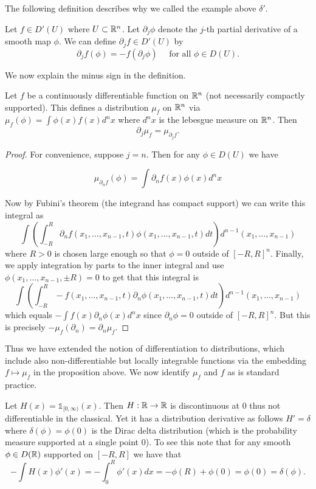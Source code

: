 \documentclass[twoside, a4paper, 10pt]{amsart}
\begin{document}
The following definition describes why we called the example above $\delta'$.

\begin{mydef} Let $f \in D'(U)$ where $U \subset \mathbb{R}^n$. Let $\partial_j \phi$ denote the $j$-th partial derivative of a smooth map $\phi$. We can define $\partial_j f \in D'(U)$ by $$\partial_j f (\phi) = - f(\partial_j \phi) \quad \text{ for all } \phi \in D(U).$$ 

\end{mydef}

We now explain the minus sign in the definition.

\begin{prop} Let $f$ be a continuously differentiable function on $\mathbb{R}^n$ (not necessarily compactly supported). This defines a distribution $\mu_f$ on $\mathbb{R}^n$ via $\mu_f (\phi) = \int \phi(x) f(x) d^n x$ where $d^n x$ is the lebesgue measure on $\mathbb{R}^n$. Then $$\partial_j \mu_f = \mu_{\partial_j f}.$$

\end{prop}

\begin{proof} For convenience, suppose $j = n$. Then for any $\phi \in D(U)$ we have 

$$ \mu_{\partial_n f} (\phi) = \int \partial_n f(x) \phi (x) d^n x $$

Now by Fubini's theorem (the integrand has compact support) we can write this integral as $$ \int \left(\int_{-R}^{R} \partial_n f(x_1, \ldots, x_{n-1}, t) \phi (x_1, \ldots, x_{n-1}, t)  dt \right) d^{n-1}(x_1, \ldots, x_{n-1})$$ where $R > 0$ is chosen large enough so that $\phi = 0$ outside of $[-R,R]^n$. Finally, we apply integration by parts to the inner integral and use $\phi(x_1, \ldots, x_{n-1}, \pm R) = 0$ to get that this integral is $$\int \left(\int_{-R}^{R} - f(x_1, \ldots, x_{n-1}, t) \partial_n \phi (x_1, \ldots, x_{n-1}, t)  dt \right) d^{n-1}(x_1, \ldots, x_{n-1})$$ which equals $- \int f(x) \partial_n \phi(x) d^n x$ since $\partial_n \phi = 0$ outside of $[-R,R]^n$.  But this is precisely $-\mu_f(\partial_n) = \partial_n \mu_f$. \end{proof}

Thus we have extended the notion of differentiation to distributions, which include also non-differentiable but locally integrable functions via the embedding $f \mapsto \mu_f$ in the proposition above. We now identify $\mu_f$ and $f$ as is standard practice. 

\begin{eg} Let $H(x) = \mathds{1}_{[0, \infty)} (x)$. Then $H:\mathbb{R} \to \mathbb{R}$ is discontinuous at $0$ thus not differentiable in the classical. Yet it has a distribution derivative as follows $H' = \delta$ where $\delta(\phi) = \phi(0)$ is the Dirac delta distribution (which is the probability measure supported at a single point $0$). To see this note that for any smooth $\phi \in D(\mathbb{R})$ supported on $[-R,R]$ we have that $$-\int H(x) \phi'(x) = -\int_0^R \phi'(x) dx = -\phi(R) + \phi(0) = \phi(0) = \delta(\phi).  $$

\end{eg}
\end{document}
